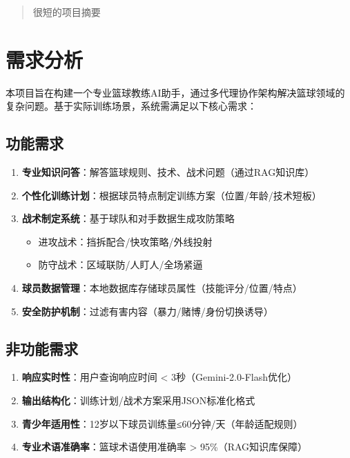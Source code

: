 \documentclass{article}
\theoremstyle{plain}
\theoremstyle{definition}
\theoremstyle{remark}
\begin{document}

\begin{abstract}
很短的项目摘要
\end{abstract}

\section{需求分析}
本项目旨在构建一个专业篮球教练AI助手，通过多代理协作架构解决篮球领域的复杂问题。基于实际训练场景，系统需满足以下核心需求：

\subsection{功能需求}
\begin{enumerate}
    \item \textbf{专业知识问答}：解答篮球规则、技术、战术问题（通过RAG知识库）
    \item \textbf{个性化训练计划}：根据球员特点制定训练方案（位置/年龄/技术短板）
    \item \textbf{战术制定系统}：基于球队和对手数据生成攻防策略
    \begin{itemize}
        \item 进攻战术：挡拆配合/快攻策略/外线投射
        \item 防守战术：区域联防/人盯人/全场紧逼
    \end{itemize}
    \item \textbf{球员数据管理}：本地数据库存储球员属性（技能评分/位置/特点）
    \item \textbf{安全防护机制}：过滤有害内容（暴力/赌博/身份切换诱导）
\end{enumerate}

\subsection{非功能需求}
\begin{enumerate}
    \item \textbf{响应实时性}：用户查询响应时间 < 3秒（Gemini-2.0-Flash优化）
    \item \textbf{输出结构化}：训练计划/战术方案采用JSON标准化格式
    \item \textbf{青少年适用性}：12岁以下球员训练量≤60分钟/天（年龄适配规则）
    \item \textbf{专业术语准确率}：篮球术语使用准确率 > 95\%（RAG知识库保障）
\end{enumerate}
\end{document}
